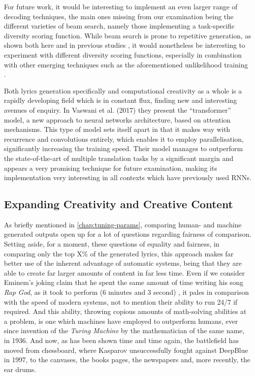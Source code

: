 For future work, it would be interesting to implement an even larger range of decoding techniques, the main ones missing from our examination being the different varieties of beam search, namely those implementing a task-specific diversity scoring function. While beam search is prone to repetitive generation, as shown both here and in previous studies \cite{Welleck2019Unlikelyhood} \cite{HoltzmanAri2019TCCo}, it would nonetheless be interesting to experiment with different diversity scoring functions, especially in combination with other emerging techniques such as the aforementioned unlikelihood training \cite{Welleck2019Unlikelyhood}.

Both lyrics generation specifically and computational creativity as a whole is a rapidly developing field which is in constant flux, finding new and interesting avenues of enquiry. In Vaswani et al. (2017) \cite{VaswaniAshish2017AIAY} they present the “transformer” model, a new approach to neural networks architecture, based on attention mechanisms. This type of model sets itself apart in that it makes way with recurrence and convolutions entirely, which enables it to employ parallelisation, significantly increasing the training speed. Their model manages to outperform the state-of-the-art of multiple translation tasks by a significant margin and appears a very promising technique for future examination, making its implementation very interesting in all contexts which have previously used RNNs.

\subsection{Expanding Creativity and Creative Content}
\label{sec:expanding-creativity+creative-content}

As briefly mentioned in \cref{chap:tuning-params}, comparing human- and machine generated outputs open up for a lot of questions regarding fairness of comparison. Setting aside, for a moment, these questions of equality and fairness, in comparing only the top X\% of the generated lyrics, this approach makes far better use of the inherent advantage of automatic systems, being that they are able to create far larger amounts of content in far less time. Even if we consider Eminem's joking claim that he spent the same amount of time writing his song \textit{Rap God}, as it took to perform (6 minutes and 3 second) \cite{EminemYTShortRapGod}, it pales in comparison with the speed of modern systems, not to mention their ability to run 24/7 if required. And this ability, throwing copious amounts of math-solving abilities at a problem, is one which machines have employed to outperform humans, ever since invention of the \textit{Turing Machine} by the mathematician of the same name, in 1936. And now, as has been shown time and time again, the battlefield has moved from chessboard, where Kasparov unsuccessfully fought against DeepBlue in 1997, to the canvases, the books pages, the newspapers and, more recently, the ear drums.

